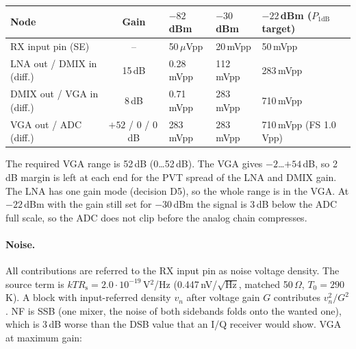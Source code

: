 \par\medskip\noindent\small
\begin{tabularx}{\textwidth}{@{}l c L L L@{}}
	\toprule
	\textbf{Node} & \textbf{Gain} & \textbf{$-82$\,dBm} & \textbf{$-30$\,dBm} & \textbf{$-22$\,dBm ($P_\mathrm{1dB}$ target)} \\
	\midrule
	RX input pin (SE) & -- & 50\,$\mu$Vpp & 20\,mVpp & 50\,mVpp \\
	LNA out / DMIX in (diff.) & 15\,dB & 0.28\,mVpp & 112\,mVpp & 283\,mVpp \\
	DMIX out / VGA in (diff.) & 8\,dB & 0.71\,mVpp & 283\,mVpp & 710\,mVpp \\
	VGA out / ADC (diff.) & $+52$ / $0$ / $0$\,dB & 283\,mVpp & 283\,mVpp & 710\,mVpp (FS 1.0\,Vpp) \\
	\bottomrule
\end{tabularx}\par\normalsize

\medskip
\noindent The required VGA range is 52\,dB (0\dots52\,dB). The VGA gives
$-2$\dots$+54$\,dB, so 2\,dB margin is left at each end for the PVT spread of the
LNA and DMIX gain. The LNA has one gain mode (decision D5), so the whole range is in
the VGA. At $-22$\,dBm with the gain still set for $-30$\,dBm the signal is 3\,dB
below the ADC full scale, so the ADC does not clip before the analog chain compresses.

\paragraph{Noise.}
All contributions are referred to the RX input pin as noise voltage density.
The source term is $kTR_\mathrm{s} = 2.0\cdot10^{-19}$\,V$^2$/Hz (0.447\,nV/$\sqrt{\mathrm{Hz}}$,
matched 50\,$\Omega$, $T_0 = 290$\,K). A block with input-referred density $v_n$
after voltage gain $G$ contributes $v_n^2/G^2$. NF is SSB (one mixer, the noise of
both sidebands folds onto the wanted one), which is 3\,dB worse than the DSB value
that an I/Q receiver would show. VGA at maximum gain:

